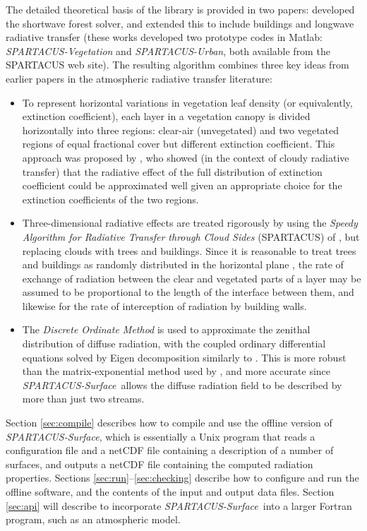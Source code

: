 \documentclass[a4,oneside]{article}
\def\spsurf{\emph{SPARTACUS-Surface}}
\begin{document}
The detailed theoretical basis of the library is provided in two
papers: \cite{Hogan+2018} developed the shortwave forest solver, and
\cite{Hogan2019b} extended this to include buildings and longwave
radiative transfer (these works developed two prototype codes in
Matlab: \emph{SPARTACUS-Vegetation} and \emph{SPARTACUS-Urban}, both
available from the SPARTACUS web site).  The resulting algorithm
combines three key ideas from earlier papers in the atmospheric
radiative transfer literature:
%
\begin{itemize}
\item To represent horizontal variations in vegetation leaf density
  (or equivalently, extinction coefficient), each layer in a
  vegetation canopy is divided horizontally into three regions:
  clear-air (unvegetated) and two vegetated regions of equal
  fractional cover but different extinction coefficient.  This
  approach was proposed by \cite{Shonk+2008}, who showed (in the
  context of cloudy radiative transfer) that the radiative effect of
  the full distribution of extinction coefficient could be
  approximated well given an appropriate choice for the extinction
  coefficients of the two regions.
\item Three-dimensional radiative effects are treated rigorously by
  using the \emph{Speedy Algorithm for Radiative Transfer through
    Cloud Sides} (SPARTACUS) of \cite{Hogan+2016}, but replacing
  clouds with trees and buildings.  Since it is reasonable to treat
  trees and buildings as randomly distributed in the horizontal plane
  \cite[see also][]{Hogan2019a}, the rate of exchange of radiation
  between the clear and vegetated parts of a layer may be assumed to
  be proportional to the length of the interface between them, and
  likewise for the rate of interception of radiation by building
  walls.
\item The \emph{Discrete Ordinate Method} is used to approximate the
  zenithal distribution of diffuse radiation, with the coupled
  ordinary differential equations solved by Eigen decomposition
  similarly to \cite{Stamnes+1988}. This is more robust than the
  matrix-exponential method used by \cite{Hogan+2016}, and more
  accurate since \spsurf\ allows the diffuse radiation field to be
  described by more than just two streams.
\end{itemize}

Section \ref{sec:compile} describes how to compile and use the offline
version of \spsurf, which is essentially a Unix program that reads a
configuration file and a netCDF file containing a description of a
number of surfaces, and outputs a netCDF file containing the computed
radiation properties. Sections
\ref{sec:run}--\ref{sec:checking} describe how to configure
and run the offline software, and the contents of the input and output
data files.  Section \ref{sec:api} will describe to incorporate
\spsurf\ into a larger Fortran program, such as an atmospheric model.
\end{document}

